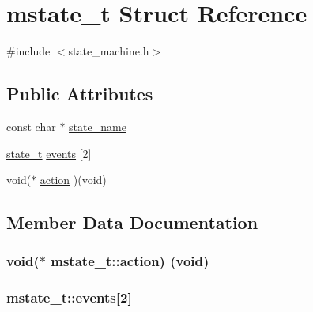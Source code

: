 \hypertarget{structmstate__t}{}\section{mstate\+\_\+t Struct Reference}
\label{structmstate__t}


{\ttfamily \#include $<$state\+\_\+machine.\+h$>$}

\subsection*{Public Attributes}
\begin{DoxyCompactItemize}
\item 
const char $\ast$ \hyperlink{structmstate__t_a4896c554397f6e870631cfa20181f5cb}{state\+\_\+name}
\item 
\hyperlink{state__machine_8h_aa0aafed44fec19806d8f9ad834be1248}{state\+\_\+t} \hyperlink{structmstate__t_ad7f00c99e78d768a8d426e35d90b57e9}{events} \mbox{[}2\mbox{]}
\item 
void($\ast$ \hyperlink{structmstate__t_a03f4847184c75e5655a23db334d31a7f}{action} )(void)
\end{DoxyCompactItemize}


\subsection{Member Data Documentation}
\subsubsection[{\texorpdfstring{action}{action}}]{\setlength{\rightskip}{0pt plus 5cm}void($\ast$ mstate\+\_\+t\+::action) (void)}\hypertarget{structmstate__t_a03f4847184c75e5655a23db334d31a7f}{}\label{structmstate__t_a03f4847184c75e5655a23db334d31a7f}
\subsubsection[{\texorpdfstring{events}{events}}]{ mstate\+\_\+t\+::events\mbox{[}2\mbox{]}}\hypertarget{structmstate__t_ad7f00c99e78d768a8d426e35d90b57e9}{}\label{structmstate__t_ad7f00c99e78d768a8d426e35d90b57e9}

